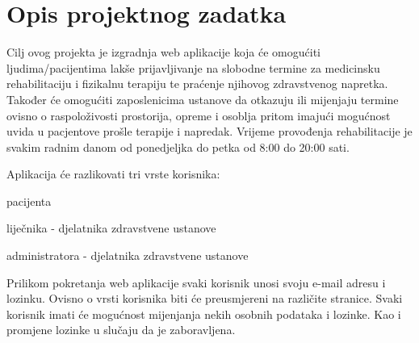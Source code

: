 
\chapter{Opis projektnog zadatka}
		
		Cilj ovog projekta je izgradnja web aplikacije koja će omogućiti ljudima/pacijentima lakše prijavljivanje na slobodne termine za medicinsku rehabilitaciju i fizikalnu terapiju te praćenje njihovog zdravstvenog napretka. Također će omogućiti zaposlenicima ustanove da otkazuju ili mijenjaju termine ovisno o raspoloživosti prostorija, opreme i osoblja pritom imajući mogućnost uvida u pacjentove prošle terapije i napredak. Vrijeme provođenja rehabilitacije je svakim radnim danom od ponedjeljka do petka od 8:00 do 20:00 sati.
		
		\noindent Aplikacija će razlikovati tri vrste korisnika: 
		\begin{packed_item}
			
			\item  pacijenta
			\item  liječnika - djelatnika zdravstvene ustanove
			\item  administratora - djelatnika zdravstvene ustanove
		\end{packed_item}
		
		Prilikom pokretanja web aplikacije svaki korisnik unosi svoju e-mail adresu i lozinku. Ovisno o vrsti korisnika biti će preusmjereni na različite stranice. Svaki korisnik imati će mogućnost mijenjanja nekih osobnih podataka i lozinke. Kao i promjene lozinke u slučaju da je zaboravljena.
		
